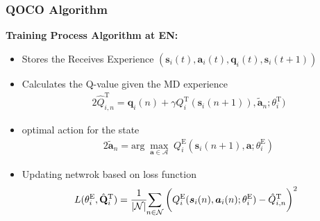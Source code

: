 \begin{frame}
	\frametitle{QOCO Algorithm}
	
	\textbf{Training Process Algorithm at EN:}
	
	\vfill
	

	\begin{itemize}[]
		
		\item Stores the Receives Experience $(\boldsymbol{s}_i(t), \boldsymbol{a}_i(t), \boldsymbol{q}_i(t), \boldsymbol{s}_i(t+1))$ 
		
		
		\item Calculates the Q-value given the MD experience
		\begin{alignat}{2}
			\hat{Q}_{i,n}^{\text{T}} = \boldsymbol{q}_i(n) + \gamma Q_i^{\text{T}}(\boldsymbol{s}_i(n+1)), \tilde{\boldsymbol{a}}_n; \theta_i^{\text{T}})
			\label{28}  
		\end{alignat}  
		
		
		\item optimal action for the state
		\begin{alignat}{2}
			\tilde{\boldsymbol{a}}_n = \text{arg} \; \max_{\boldsymbol{a} \in \mathcal{A}} \; Q_i^{\text{E}}(\boldsymbol{s}_i(n+1), \boldsymbol{a}; \theta_i^{\text{E}})
			\label{29}  
		\end{alignat}
		
		\item Updating netwrok based on loss function
		\begin{alignat}{2}
			\hspace{-2mm}L(\theta_i^{\text{E}},\hat{\mathbf{Q}}_i^{\text{T}}) = {1 \over |\mathcal{N}| }\hspace{-1mm} \sum\limits_{n \in \mathcal{N}} 	\bigg(Q_i^{\text{E}}(\boldsymbol{s}_i(n) , \boldsymbol{a}_i(n); \theta_i^{\text{E}} ) -   \hat{Q}^{\text{T}}_{i,n}  \bigg)^2
			\label{30}  
		\end{alignat}  

	\end{itemize}
	
	
\end{frame}